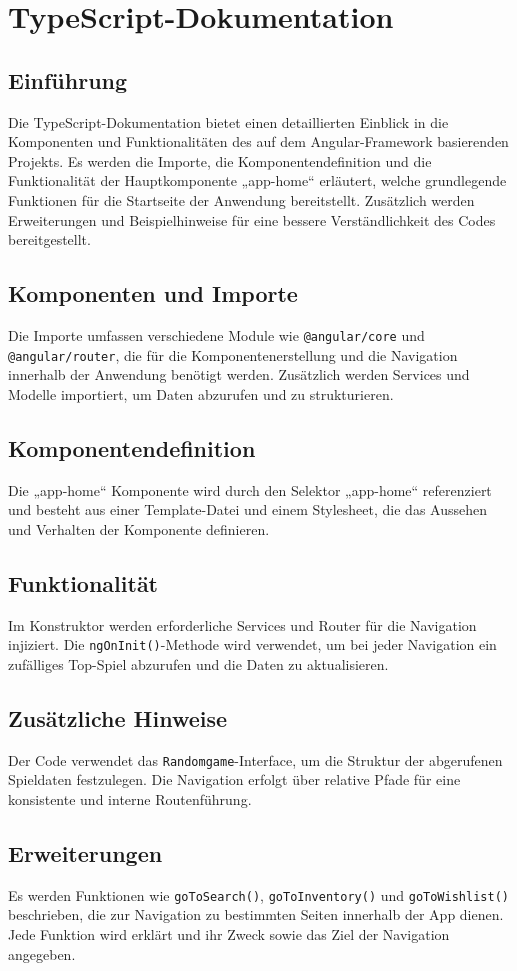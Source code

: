 \section{TypeScript-Dokumentation}
\subsection{Einführung}
Die TypeScript-Dokumentation bietet einen detaillierten Einblick in die Komponenten und Funktionalitäten des auf dem Angular-Framework basierenden Projekts. Es werden die Importe,
die Komponentendefinition und die Funktionalität der Hauptkomponente „app-home“ erläutert,
welche grundlegende Funktionen für die Startseite der Anwendung bereitstellt. Zusätzlich werden Erweiterungen und Beispielhinweise für eine bessere Verständlichkeit des Codes bereitgestellt.
\subsection{Komponenten und Importe}
Die Importe umfassen verschiedene Module wie \texttt{@angular/core} und \texttt{@angular/router},
die für die Komponentenerstellung und die Navigation innerhalb der Anwendung benötigt werden. Zusätzlich werden Services und Modelle importiert, um Daten abzurufen und zu strukturieren.
\subsection{Komponentendefinition}
Die „app-home“ Komponente wird durch den Selektor „app-home“ referenziert und besteht aus einer Template-Datei und einem Stylesheet, die das Aussehen und Verhalten der Komponente definieren.
\subsection{Funktionalität}
Im Konstruktor werden erforderliche Services und Router für die Navigation injiziert. Die \texttt{ngOnInit()}-Methode wird verwendet, um bei jeder Navigation ein zufälliges Top-Spiel abzurufen und die Daten zu aktualisieren.
\subsection{Zusätzliche Hinweise}
Der Code verwendet das \texttt{Randomgame}-Interface, um die Struktur der abgerufenen Spieldaten festzulegen. Die Navigation erfolgt über relative Pfade für eine konsistente und interne Routenführung.
\subsection{Erweiterungen}
Es werden Funktionen wie \texttt{goToSearch()}, \texttt{goToInventory()} und \texttt{goToWishlist()} beschrieben, die zur Navigation zu bestimmten Seiten innerhalb der App dienen. Jede Funktion wird erklärt und ihr Zweck sowie das Ziel der Navigation angegeben.
